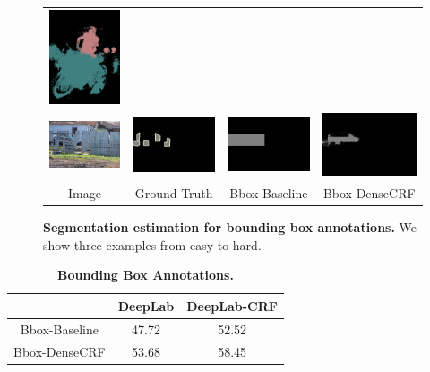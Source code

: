 \begin{figure}
\begin{tabular}{c c c c}
    \includegraphics[width=0.21\linewidth]{fig/erode_bbox/crf/2009_002382.png} \\    
    \includegraphics[width=0.21\linewidth]{fig/erode_bbox/img/2008_004339.jpg} & 
    \includegraphics[width=0.21\linewidth]{fig/erode_bbox/gt/2008_004339.png} & 
    \includegraphics[width=0.21\linewidth]{fig/erode_bbox/bbox/2008_004339.png} & 
    \includegraphics[width=0.21\linewidth]{fig/erode_bbox/crf/2008_004339.png} \\    
    {\scriptsize Image} & {\scriptsize Ground-Truth} & {\scriptsize Bbox-Baseline} & {\scriptsize Bbox-DenseCRF}
  \end{tabular}
  \caption{{\bf Segmentation estimation for bounding box annotations.} We show three examples from easy to hard.}
  \label{fig:bbox_illustration}
\end{figure}

\begin{table}
  \centering
  \caption{{\bf{Bounding Box Annotations.}}}
  \begin{tabular}{| c | c | c |}
    \hline
     & DeepLab & DeepLab-CRF \\
    \hline
    Bbox-Baseline & 47.72 & 52.52 \\ 
    \hline
    Bbox-DenseCRF & 53.68 & 58.45 \\
    \hline
    \end{tabular}
  \label{tb:bbox_annot}
\end{table}


